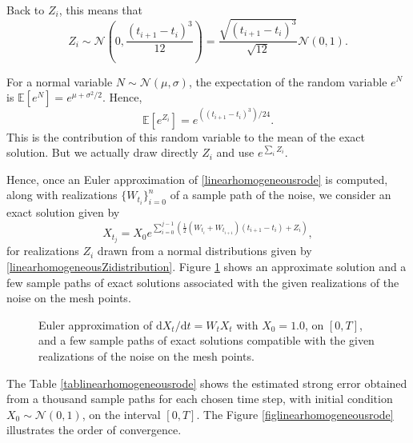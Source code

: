 \documentclass[reqno,12pt]{amsart}
\theoremstyle{plain}%
\theoremstyle{definition}
\begin{document}
Back to $Z_i$, this means that
\begin{equation}
    \label{linearhomogeneousZidistribution}
    Z_i \sim \mathcal{N}\left(0, \frac{(t_{i+1}- t_i)^3}{12}\right) = \frac{\sqrt{(t_{i+1} - t_i)^3}}{\sqrt{12}}\mathcal{N}(0, 1).
\end{equation}

For a normal variable $N \sim \mathcal{N}(\mu, \sigma)$, the expectation of the random variable $e^N$ is $\mathbb{E}[e^N] = e^{\mu + \sigma^2/2}$. Hence,
\begin{equation}
    \mathbb{E}[e^{Z_i}] = e^{((t_{i+1}- t_i)^3)/24}.
\end{equation}
This is the contribution of this random variable to the mean of the exact solution. But we actually draw directly $Z_i$ and use $e^{\sum_i Z_i}$.

Hence, once an Euler approximation of \eqref{linearhomogeneousrode} is computed, along with realizations $\{W_{t_i}\}_{i=0}^n$ of a sample path of the noise, we consider an exact solution given by
\begin{equation}
    \label{Xtlinearhomogeneousrode}
    X_{t_j} = X_0 e^{\sum_{i = 0}^{j-1}\left(\frac{1}{2}\left(W_{t_i} + W_{t_{i+1}}\right)(t_{i+1} - t_i) + Z_i\right)},
\end{equation}
for realizations $Z_i$ drawn from a normal distributions given by \eqref{linearhomogeneousZidistribution}. Figure \ref{samplepathslinearhomogeneousrode} shows an approximate solution and a few sample paths of exact solutions associated with the given realizations of the noise on the mesh points.
\begin{figure}
    \label{samplepathslinearhomogeneousrode}
    \caption{Euler approximation of $\mathrm{d}X_t/\mathrm{d}t = W_t X_t$ with $X_0 = 1.0$, on $[0, T]$, and a few sample paths of exact solutions compatible with the given realizations of the noise on the mesh points.}
\end{figure}

The Table \ref{tablinearhomogeneousrode} shows the estimated strong error obtained from a thousand sample paths for each chosen time step, with initial condition $X_0 \sim \mathcal{N}(0, 1)$, on the interval $[0, T]$. The Figure \ref{figlinearhomogeneousrode} illustrates the order of convergence.
\end{document}
